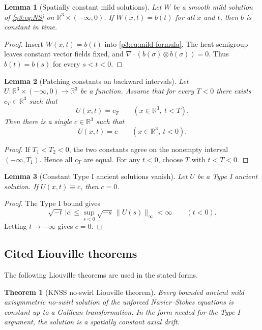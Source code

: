 \documentclass[11pt]{amsart}
\theoremstyle{plain}
\newtheorem{theorem}{Theorem}[section]
\newtheorem{lemma}[lemma]{Lemma}
\theoremstyle{definition}
\theoremstyle{remark}
\numberwithin{equation}{section}
\begin{document}
\begin{lemma}[Spatially constant mild solutions]\label{p3:lem:spatial-constant-mild}
Let \(W\) be a smooth mild solution of \eqref{p3:eq:NS} on
\(\mathbb R^3\times(-\infty,0)\).  If \(W(x,t)=b(t)\) for all \(x\) and \(t\),
then \(b\) is constant in time.
\end{lemma}

\begin{proof}
Insert \(W(x,t)=b(t)\) into \eqref{p3:eq:mild-formula}.  The heat semigroup
leaves constant vector fields fixed, and
\(\nabla\cdot(b(\sigma)\otimes b(\sigma))=0\).  Thus
\(b(t)=b(s)\) for every \(s<t<0\).
\end{proof}

\begin{lemma}[Patching constants on backward intervals]
\label{p3:lem:patch-constants}
Let \(U:\mathbb R^3\times(-\infty,0)\to\mathbb R^3\) be a function.  Assume
that for every \(T<0\) there exists \(c_T\in\mathbb R^3\) such that
\[
   U(x,t)=c_T\qquad(x\in\mathbb R^3,\ t<T).
\]
Then there is a single \(c\in\mathbb R^3\) such that
\[
   U(x,t)=c\qquad(x\in\mathbb R^3,\ t<0).
\]
\end{lemma}

\begin{proof}
If \(T_1<T_2<0\), the two constants agree on the nonempty interval
\((-\infty,T_1)\).  Hence all \(c_T\) are equal.  For any \(t<0\), choose
\(T\) with \(t<T<0\).
\end{proof}

\begin{lemma}[Constant Type I ancient solutions vanish]
\label{p3:lem:galilean-typeI-zero}
Let \(U\) be a Type I ancient solution.  If \(U(x,t)\equiv c\), then
\(c=0\).
\end{lemma}

\begin{proof}
The Type I bound gives
\[
   \sqrt{-t}\,|c|
   \le
   \sup_{s<0}\sqrt{-s}\,\|U(s)\|_\infty<\infty
   \qquad(t<0).
\]
Letting \(t\to-\infty\) gives \(c=0\).
\end{proof}

\subsection{Cited Liouville theorems}

The following Liouville theorems are used in the stated forms.

\begin{theorem}[KNSS no-swirl Liouville theorem]
\label{p3:thm:knss-noswirl}
Every bounded ancient mild axisymmetric no-swirl solution of the unforced
Navier--Stokes equations is constant up to a Galilean transformation.  In the
form needed for the Type I argument, the solution is a spatially constant
axial drift.
\end{theorem}
\end{document}
